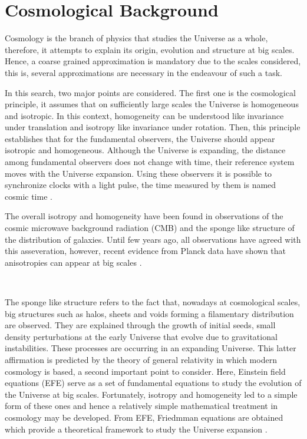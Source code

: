 	\chapter{ Cosmological Background }\label{chap:marco}

Cosmology is the branch of physics that studies the Universe as a whole, 
therefore, it attempts to explain its origin, evolution and structure 
at big scales. Hence, a coarse grained approximation is mandatory due
to the scales considered, this is, several approximations are necessary 
in the endeavour of such a task.

In this search, two major points are considered. The first one is the 
cosmological principle, it assumes that on sufficiently large scales the Universe 
is homogeneous and isotropic. In this context, homogeneity can be understood like 
invariance under translation and isotropy like invariance under rotation. Then, 
this principle establishes that for the fundamental observers, the Universe should 
appear isotropic and homogeneous.
Although the Universe is expanding, the distance among fundamental observers
does not change with time, their reference system moves with the Universe expansion. 
Using these observers it is possible to 
synchronize clocks with a light pulse, the time measured by them is named
cosmic time \cite{Longair}. 


The overall isotropy and homogeneity have been found in observations of the
cosmic microwave background radiation (CMB) and the sponge like structure
of the distribution of galaxies. Until few years ago, all observations have agreed with this 
asseveration, however, recent evidence from Planck data have shown that anisotropies
can appear at big scales \cite{planck}. 

\

The sponge like structure refers to the fact that, nowadays at cosmological scales, 
big structures such as halos, sheets and voids forming a filamentary distribution are observed. 
They are explained through the growth of initial seeds, 
small density perturbations at the early Universe that evolve due to gravitational instabilities. 
These processes are occurring in an expanding Universe. This latter affirmation is predicted 
by the theory of general relativity in which modern cosmology is based, a second important
point to consider. 
Here, Einstein field equations (EFE) serve as a set of fundamental equations to 
study the evolution of the Universe at big scales. Fortunately, isotropy and homogeneity led 
to a simple form of these ones and hence a relatively simple mathematical treatment in cosmology may be
developed. From EFE, Friedmman equations are obtained which provide a theoretical 
framework to study the Universe expansion \cite{padma}. 

